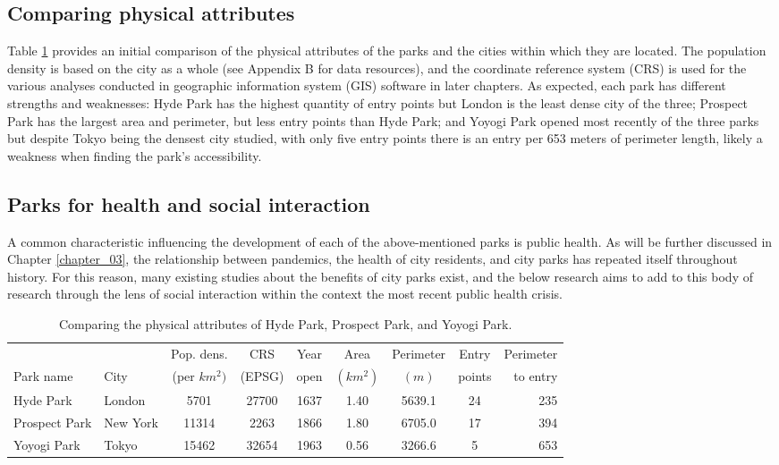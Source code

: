 \begin{multicols}{2}
\subsection{Comparing physical attributes}
Table \ref{table:city_parks} provides an initial comparison of the physical attributes of the parks and the cities within which they are located. The population density is based on the city as a whole (see Appendix B for data resources), and the coordinate reference system (CRS) is used for the various analyses conducted in geographic information system (GIS) software in later chapters. As expected, each park has different strengths and weaknesses: Hyde Park has the highest quantity of entry points but London is the least dense city of the three; Prospect Park has the largest area and perimeter, but less entry points than Hyde Park; and Yoyogi Park opened most recently of the three parks but despite Tokyo being the densest city studied, with only five entry points there is an entry per 653 meters of perimeter length, likely a weakness when finding the park's accessibility.

\subsection{Parks for health and social interaction}
A common characteristic influencing the development of each of the above-mentioned parks is public health. As will be further discussed in Chapter \ref{chapter_03}, the relationship between pandemics, the health of city residents, and city parks has repeated itself throughout history. For this reason, many existing studies about the benefits of city parks exist, and the below research aims to add to this body of research through the lens of social interaction within the context the most recent public health crisis.

\end{multicols}

\begin{table}[H]
\small
\begin{tabular}{llccccccr}
\toprule
{} &      {} &  Pop. dens. &          CRS &  Year &  Area &  Perimeter &  Entry &  Perimeter \\
Park name &      City &  (per $ km^{2}) $ &          (EPSG) &  open &  $ (km^{2}) $ &  $ (m) $ &  points &  to entry \\
\midrule
Hyde Park &    London &             5701 &  27700 &          1637 &       1.40 &          5639.1 &            24 &                 235 \\
Prospect Park &  New York &            11314 &   2263 &          1866 &       1.80 &          6705.0 &            17 &                 394 \\
Yoyogi Park &     Tokyo &            15462 &  32654 &          1963 &       0.56 &          3266.6 &             5 &                 653 \\
\bottomrule
\end{tabular}
\caption[City parks]{Comparing the physical attributes of Hyde Park, Prospect Park, and Yoyogi Park.}
\label{table:city_parks}
\end{table}

